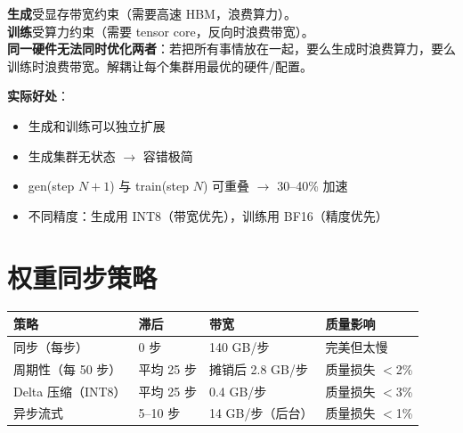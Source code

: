 \begin{keybox}[为什么要解耦？]
\textbf{生成}受显存带宽约束（需要高速 HBM，浪费算力）。\\

\textbf{训练}受算力约束（需要 tensor core，反向时浪费带宽）。\\

\textbf{同一硬件无法同时优化两者}：若把所有事情放在一起，要么生成时浪费算力，要么训练时浪费带宽。解耦让每个集群用最优的硬件/配置。

\textbf{实际好处}：

\begin{itemize}
  \item 生成和训练可以独立扩展
  \item 生成集群无状态 $\rightarrow$ 容错极简
  \item gen(step $N+1$) 与 train(step $N$) 可重叠 $\rightarrow$ 30--40\% 加速
  \item 不同精度：生成用 INT8（带宽优先），训练用 BF16（精度优先）
\end{itemize}
\end{keybox}

\section{权重同步策略}
\label{weight-synchronization-strategies}

{\small
\noindent\begin{tabularx}{\linewidth}{@{}l l l Z{1}@{}}
\toprule
\textbf{策略} & \textbf{滞后} & \textbf{带宽} & \textbf{质量影响} \\
\midrule
同步（每步） & 0 步 & 140 GB/步 & 完美但太慢 \\
周期性（每 50 步） & 平均 25 步 & 摊销后 2.8 GB/步 & 质量损失 $<$2\% \\
Delta 压缩（INT8） & 平均 25 步 & 0.4 GB/步 & 质量损失 $<$3\% \\
异步流式 & 5--10 步 & 14 GB/步（后台） & 质量损失 $<$1\% \\
\bottomrule
\end{tabularx}
}

